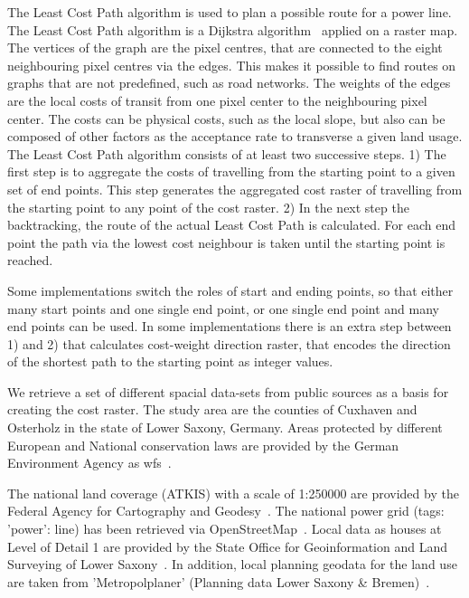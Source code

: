 
The Least Cost Path algorithm is used to plan a possible route for a power line.
The Least Cost Path algorithm is a Dijkstra algorithm~\cite{dijkstra_note_1959} applied on a raster map.
The vertices of the graph are the pixel centres, that are connected to the eight neighbouring pixel centres via the edges.
This makes it possible to find routes on graphs that are not predefined, such as road networks.
The weights of the edges are the local costs of transit from one pixel center to the neighbouring pixel center.
The costs can be physical costs, such as the local slope, but also can be composed of other factors as the acceptance rate to transverse a given land usage.
The Least Cost Path algorithm consists of at least two successive steps.
1) The first step is to aggregate the costs of travelling from the starting point to a given set of end points.
This step generates the aggregated cost raster of travelling from the starting point to any point of the cost raster.
2) In the next step the backtracking, the route of the actual Least Cost Path is calculated.
For each end point the path via the lowest cost neighbour is taken until the starting point is reached.

Some implementations switch the roles of start and ending points, so that either many start points and one single end point, or one single end point and many end points can be used.
In some implementations there is an extra step between 1) and 2) that calculates cost-weight direction raster, that encodes the direction of the shortest
path to the starting point as integer values.

We retrieve a set of different spacial data-sets from  public sources as a basis for creating the cost raster.
The study area are the counties of Cuxhaven and Osterholz in the state of Lower Saxony, Germany.
Areas protected by different European and National conservation laws are provided by the German Environment Agency
as \acrfull{wfs}~\cite{noauthor_schutzgebiete_2015}.

The national land coverage (ATKIS) with a scale of 1:250000 are provided by the Federal Agency for Cartography
and Geodesy~\cite{noauthor_digitales_2021}.
The national power grid (tags: 'power': line) has been retrieved via OpenStreetMap~\cite{boeing_osmnx_2017}.
Local data as houses at Level of Detail 1 are provided by the State Office for Geoinformation and Land Surveying of
Lower Saxony~\cite{noauthor_opengeodatani_2022}.
In addition, local planning geodata for the land use are taken
from 'Metropolplaner' (Planning data Lower Saxony \& Bremen)~\cite{noauthor_metropolplaner_2022}.

